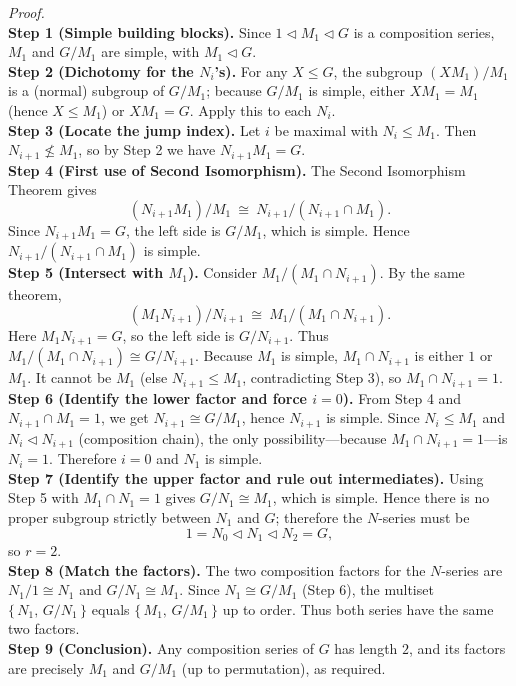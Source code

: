\documentclass[12pt]{article}
\theoremstyle{definition}
\begin{document}
\emph{Proof.}\\
\textbf{Step 1 (Simple building blocks).} Since $1\lhd M_1\lhd G$ is a composition series, $M_1$ and $G/M_1$ are simple, with $M_1\lhd G$.\\
\textbf{Step 2 (Dichotomy for the $N_i$’s).} For any $X\le G$, the subgroup $(XM_1)/M_1$ is a (normal) subgroup of $G/M_1$; because $G/M_1$ is simple, either $XM_1=M_1$ (hence $X\le M_1$) or $XM_1=G$. Apply this to each $N_i$.\\
\textbf{Step 3 (Locate the jump index).} Let $i$ be maximal with $N_i\le M_1$. Then $N_{i+1}\nleq M_1$, so by Step 2 we have $N_{i+1}M_1=G$.\\
\textbf{Step 4 (First use of Second Isomorphism).} The Second Isomorphism Theorem gives
\[
(N_{i+1}M_1)/M_1\ \cong\ N_{i+1}/(N_{i+1}\cap M_1).
\]
Since $N_{i+1}M_1=G$, the left side is $G/M_1$, which is simple. Hence $N_{i+1}/(N_{i+1}\cap M_1)$ is simple.\\
\textbf{Step 5 (Intersect with $M_1$).} Consider $M_1/(M_1\cap N_{i+1})$. By the same theorem,
\[
(M_1N_{i+1})/N_{i+1}\ \cong\ M_1/(M_1\cap N_{i+1}).
\]
Here $M_1N_{i+1}=G$, so the left side is $G/N_{i+1}$. Thus $M_1/(M_1\cap N_{i+1})\cong G/N_{i+1}$. Because $M_1$ is simple, $M_1\cap N_{i+1}$ is either $1$ or $M_1$. It cannot be $M_1$ (else $N_{i+1}\le M_1$, contradicting Step 3), so $M_1\cap N_{i+1}=1$.\\
\textbf{Step 6 (Identify the lower factor and force $i=0$).} From Step 4 and $N_{i+1}\cap M_1=1$, we get $N_{i+1}\cong G/M_1$, hence $N_{i+1}$ is simple. Since $N_i\le M_1$ and $N_i\lhd N_{i+1}$ (composition chain), the only possibility—because $M_1\cap N_{i+1}=1$—is $N_i=1$. Therefore $i=0$ and $N_1$ is simple.\\
\textbf{Step 7 (Identify the upper factor and rule out intermediates).} Using Step 5 with $M_1\cap N_1=1$ gives $G/N_1\cong M_1$, which is simple. Hence there is no proper subgroup strictly between $N_1$ and $G$; therefore the $N$-series must be
\[
1=N_0 \lhd N_1 \lhd N_2=G,
\]
so $r=2$.\\
\textbf{Step 8 (Match the factors).} The two composition factors for the $N$-series are $N_1/1\cong N_1$ and $G/N_1\cong M_1$. Since $N_1\cong G/M_1$ (Step 6), the multiset $\{\,N_1,\,G/N_1\,\}$ equals $\{\,M_1,\,G/M_1\,\}$ up to order. Thus both series have the same two factors.\\
\textbf{Step 9 (Conclusion).} Any composition series of $G$ has length $2$, and its factors are precisely $M_1$ and $G/M_1$ (up to permutation), as required.\\
\end{document}
